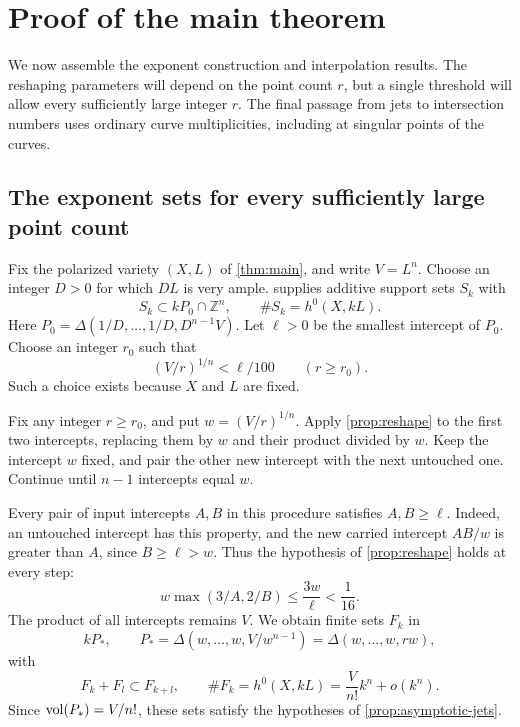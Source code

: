 \section{Proof of the main theorem}
\label{sec:conclusion}

We now assemble the exponent construction and interpolation results. The reshaping parameters will depend on the point count $r$, but a single threshold will allow every sufficiently large integer $r$. The final passage from jets to intersection numbers uses ordinary curve multiplicities, including at singular points of the curves.

\subsection{The exponent sets for every sufficiently large point count}

Fix the polarized variety $(X,L)$ of \cref{thm:main}, and write $V=L^n$. Choose an integer $D>0$ for which $DL$ is very ample.  supplies additive support sets $S_k$ with
\[
 S_k\subset kP_0\cap\mathbb{Z}^n,
 \qquad
 \#S_k=h^0(X,kL).
\]
Here $P_0=\Delta(1/D,\ldots,1/D,D^{n-1}V)$. Let $\ell>0$ be the smallest intercept of $P_0$. Choose an integer $r_0$ such that
\begin{equation}
 \label{eq:threshold}
 (V/r)^{1/n}<\ell/100\qquad(r\ge r_0).
\end{equation}
Such a choice exists because $X$ and $L$ are fixed.

Fix any integer $r\ge r_0$, and put $w=(V/r)^{1/n}$. Apply \cref{prop:reshape} to the first two intercepts, replacing them by $w$ and their product divided by $w$. Keep the intercept $w$ fixed, and pair the other new intercept with the next untouched one. Continue until $n-1$ intercepts equal $w$.

Every pair of input intercepts $A,B$ in this procedure satisfies $A,B\ge\ell$. Indeed, an untouched intercept has this property, and the new carried intercept $AB/w$ is greater than $A$, since $B\ge\ell>w$. Thus the hypothesis of \cref{prop:reshape} holds at every step:
\[
 w\max(3/A,2/B)\le\frac{3w}{\ell}<\frac1{16}.
\]
The product of all intercepts remains $V$. We obtain finite sets $F_k$ in
\begin{equation}
 \label{eq:final-simplex}
 kP_*,\qquad
 P_* =\Delta(w,\ldots,w,V/w^{n-1})
     =\Delta(w,\ldots,w,rw),
\end{equation}
with
\[
 F_k+F_l\subset F_{k+l},
 \qquad
 \#F_k=h^0(X,kL)=\frac{V}{n!}k^n+o(k^n).
\]
Since $\operatorname{vol}(P_*)=V/n!$, these sets satisfy the hypotheses of \cref{prop:asymptotic-jets}.


